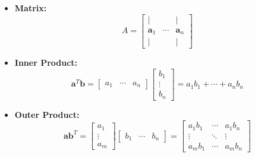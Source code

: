 \documentclass{article}
\begin{document}
\begin{itemize}

    \item \textbf{Matrix:}
    \begin{equation}
        A =
        \left[
            \begin{array}{ccc}
                | &        & | \\
                \mathbf{a}_1 & \cdots & \mathbf{a}_n \\
                | &        & |
            \end{array}
        \right]
        \label{eq:matrix}
    \end{equation}

    \item \textbf{Inner Product:}
    \begin{equation}
        \mathbf{a}^T \mathbf{b} =
        \left[
            \begin{array}{ccc}
                a_1 & \cdots & a_n
            \end{array}
        \right]
        \left[
            \begin{array}{c}
                b_1 \\
                \vdots \\
                b_n
            \end{array}
        \right]
        = a_1 b_1 + \cdots + a_n b_n
        \label{eq:innerprod}
    \end{equation}

    \item \textbf{Outer Product:}
    \begin{equation}
        \mathbf{a} \mathbf{b}^T =
        \left[
            \begin{array}{c}
                a_1 \\
                \vdots \\
                a_m
            \end{array}
        \right]
        \left[
            \begin{array}{ccc}
                b_1 & \cdots & b_n
            \end{array}
        \right]
        =
        \left[
            \begin{array}{ccc}
                a_1 b_1 & \cdots & a_1 b_n \\
                \vdots & \ddots & \vdots \\
                a_m b_1 & \cdots & a_m b_n
            \end{array}
        \right]
        \label{eq:outerprod}
    \end{equation}


\end{itemize}
\end{document}
